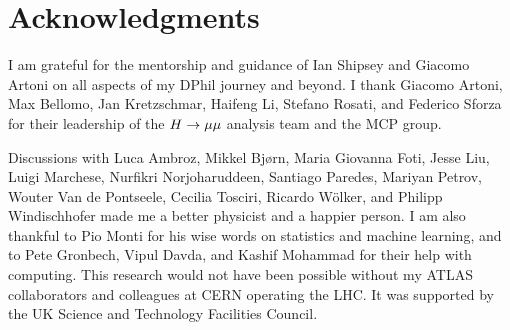 \chapter*{Acknowledgments}

I am grateful for the mentorship and guidance of Ian Shipsey and Giacomo Artoni
on all aspects of my DPhil journey and beyond. I thank Giacomo Artoni, Max Bellomo,
Jan Kretzschmar, Haifeng Li, Stefano Rosati, and Federico Sforza for their leadership
of the $H \rightarrow \mu\mu$ analysis team and the MCP group.

Discussions with Luca Ambroz, Mikkel Bj{\o}rn, Maria Giovanna Foti, Jesse Liu, Luigi Marchese,
Nurfikri Norjoharuddeen, Santiago Paredes, Mariyan Petrov, Wouter Van de Pontseele,
Cecilia Tosciri, Ricardo W\"olker, and Philipp Windischhofer made me a better physicist
and a happier person. I am also thankful to Pio Monti for his wise words on statistics
and machine learning, and to Pete Gronbech, Vipul Davda, and Kashif Mohammad for their
help with computing. This research would not have been possible without my ATLAS collaborators
and colleagues at CERN operating the LHC. It was supported by the UK Science and
Technology Facilities Council.

\thispagestyle{empty}
